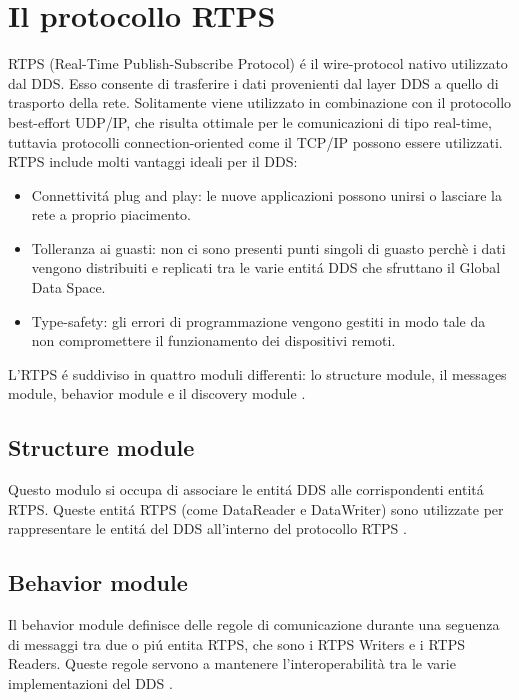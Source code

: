 \section{Il protocollo RTPS}
RTPS (Real-Time Publish-Subscribe Protocol) é il wire-protocol 
nativo utilizzato dal DDS. Esso consente di trasferire i dati provenienti
dal layer DDS a quello di trasporto della rete.
Solitamente viene utilizzato in combinazione con il protocollo
best-effort
UDP/IP, che risulta ottimale per le comunicazioni di tipo real-time, tuttavia 
protocolli connection-oriented come il TCP/IP possono essere utilizzati. 
RTPS include molti vantaggi ideali per il DDS:
\begin{itemize}
    \item Connettivitá plug and play: le nuove applicazioni possono unirsi o 
    lasciare la rete a proprio piacimento.
    \item Tolleranza ai guasti: non ci sono presenti punti singoli di 
    guasto perchè i dati vengono distribuiti e replicati tra le varie 
    entitá DDS che sfruttano il Global Data Space.
    \item Type-safety: gli errori di programmazione vengono gestiti 
    in modo tale da non compromettere il funzionamento 
    dei dispositivi remoti.
\end{itemize}
L'RTPS é suddiviso in quattro moduli differenti: lo structure module, il 
messages module, behavior module e il discovery module \cite{ddsrtps}.

\subsection{Structure module}
Questo modulo si occupa di associare le entitá DDS alle corrispondenti
entitá RTPS. Queste entitá RTPS (come DataReader e DataWriter) sono utilizzate 
per rappresentare le entitá del DDS all'interno del protocollo RTPS \cite{ddsrtps}.

\subsection{Behavior module}
Il behavior module definisce delle regole di comunicazione durante 
una seguenza di messaggi tra
due o piú entita RTPS, che sono i RTPS Writers e i RTPS Readers.
Queste regole servono a mantenere l'interoperabilità tra le varie 
implementazioni del DDS \cite{ddsrtps}.

